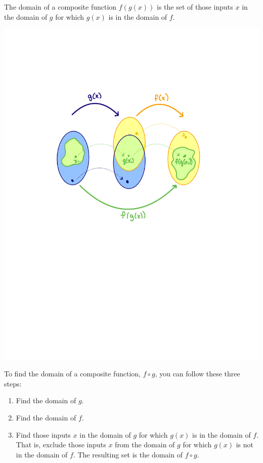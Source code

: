\documentclass{ximera}
\begin{document}
\begin{callout}
The domain of a composite function $f(g(x))$ is the set of those inputs $x$ in the domain of $g$ for which $g(x)$ is in the domain of $f$. 
\end{callout}

\begin{image}
\includegraphics{CompDom1}
\end{image}



To find the domain of a composite function, $f\circ g$, you can follow these three steps:
\begin{enumerate}[label=\arabic*)]
\item Find the domain of $g$.
\item Find the domain of $f$.
\item Find those inputs $x$ in the domain of $g$ for which $g(x)$ is in the domain of $f$.  That is, exclude those inputs $x$ from the domain of $g$ for which $g(x)$ is not in the domain of $f$.  The resulting set is the domain of $f \circ g$.  
\end{enumerate} 
\end{document}
